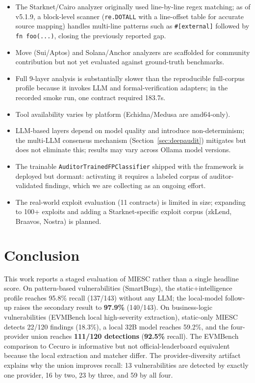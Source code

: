 \documentclass[conference]{IEEEtran}
\begin{document}
\begin{itemize}
    \item The Starknet/Cairo analyzer originally used line-by-line regex matching; as of v5.1.9, a block-level scanner (\texttt{re.DOTALL} with a line-offset table for accurate source mapping) handles multi-line patterns such as \texttt{\#[external]} followed by \texttt{fn foo(...)}, closing the previously reported gap.
    \item Move (Sui/Aptos) and Solana/Anchor analyzers are scaffolded for community contribution but not yet evaluated against ground-truth benchmarks.
    \item Full 9-layer analysis is substantially slower than the reproducible full-corpus profile because it invokes LLM and formal-verification adapters; in the recorded smoke run, one contract required 183.7s.
    \item Tool availability varies by platform (Echidna/Medusa are amd64-only).
    \item LLM-based layers depend on model quality and introduce non-determinism; the multi-LLM consensus mechanism (Section~\ref{sec:deepaudit}) mitigates but does not eliminate this; results may vary across Ollama model versions.
    \item The trainable \texttt{AuditorTrainedFPClassifier} shipped with the framework is deployed but dormant: activating it requires a labeled corpus of auditor-validated findings, which we are collecting as an ongoing effort.
    \item The real-world exploit evaluation (11 contracts) is limited in size; expanding to 100+ exploits and adding a Starknet-specific exploit corpus (zkLend, Braavos, Nostra) is planned.
\end{itemize}

\section{Conclusion}

This work reports a staged evaluation of MIESC rather than a single headline score. On pattern-based vulnerabilities (SmartBugs), the static+intelligence profile reaches 95.8\% recall (137/143) without any LLM; the local-model follow-up raises the secondary result to \textbf{97.9\%} (140/143). On business-logic vulnerabilities (EVMBench local high-severity extraction), static-only MIESC detects 22/120 findings (18.3\%), a local 32B model reaches 59.2\%, and the four-provider union reaches \textbf{111/120 detections} (\textbf{92.5\%} recall). The EVMBench comparison to Cecuro is informative but not official-leaderboard equivalent because the local extraction and matcher differ. The provider-diversity artifact explains why the union improves recall: 13 vulnerabilities are detected by exactly one provider, 16 by two, 23 by three, and 59 by all four.
\end{document}
